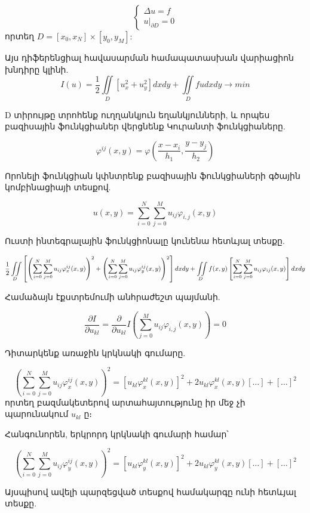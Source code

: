 \documentclass[fleqn, bachelor,subf,12pt,notitlepage]{article}
\newcommand\scalemath[2]{\scalebox{#1}{\mbox{\ensuremath{\displaystyle #2}}}}
\begin{document}
				$$
					\begin{cases}
								\Delta u =f \\
								u \Big |_{\partial D} = 0
					\end{cases}
				$$
որտեղ $D = \left[x_{0}, x_{N}\right] \times \left[y_{0}, y_{M}\right]$:

Այս դիֆերենցիալ հավասարման  համապատասխան վարիացիոն խնդիրը կլինի.
			$$I(u) = \frac{1}{2}\iint \limits_{D} \left[u_x^2 + u_y^2 \right]dxdy + \iint \limits_{D} fudxdy \longrightarrow min$$

D տիրույթը տրոհենք ուղղանկյուն եղանկյունների, և որպես բազիսային ֆունկցիաներ վերցնենք Կուրանտի ֆունկցիաները.

					$$\varphi^{ij}(x,y)=\varphi \left(\dfrac{x-x_{i}}{h_{1}}, \dfrac{y-y_{j}}{h_{2}}\right)$$

\noindent Որոնելի ֆունկցիան կփնտրենք բազիսային ֆունկցիաների գծային կոմբինացիայի տեսքով.

					$$u(x,y) = \sum_{i=0}^{N} \sum_{j=0}^{M} u_{ij}\varphi_{i, j}(x,y)$$

\noindent  Ուստի ինտեգրալային ֆունկցիոնալը կունենա հետևյալ տեսքը.

$$\scalemath{0.9}{\frac{1}{2} \iint \limits_{D}\left[\left(\sum_{i=0}^{N} \sum_{j=0}^{M}u_{ij}\varphi_{x}^{ij}(x,y)\right)^2 + \left(\sum_{i=0}^{N} \sum_{j=0}^{M}u_{ij}\varphi_{y}^{ij}(x,y)\right)^2 \right]dxdy + \iint \limits_{D}f(x,y)\left[ \sum_{i=0}^{N} \sum_{j=0}^{M}u_{ij}\varphi_{ij}(x,y)\right]dxdy}$$

\noindent  Համաձայն էքստրեմումի անհրաժեշտ պայմանի.

$$\dfrac{\partial I}{ \partial u_{kl}} = \dfrac{\partial}{\partial u_{kl}} I \left(\sum_{j=0}^{M} u_{ij}\varphi_{i, j}(x,y)\right) = 0 $$

\noindent Դիտարկենք առաջին կրկնակի գումարը.

				$$\left(\sum_{i=0}^{N} \sum_{j=0}^{M}u_{ij}\varphi_{x}^{ij}(x,y)\right)^2 = \left[u_{kl}\varphi_{x}^{kl}(x,y)\right]^{2} + 2u_{kl}\varphi_{x}^{kl}(x,y)[\dots] + [\dots]^2$$
\noindent որտեղ բազմակետերով արտահայտությունը իր մեջ չի պարունակում $u_{kl}$ ը։

\noindent Հանգունորեն, երկրորդ կրկնակի գումարի համար՝

				$$\left(\sum_{i=0}^{N} \sum_{j=0}^{M}u_{ij}\varphi_{y}^{ij}(x,y)\right)^2 = \left[u_{kl}\varphi_{y}^{kl}(x,y)\right]^{2} + 2u_{kl}\varphi_{y}^{kl}(x,y)[\dots] + [\dots]^2$$

\noindent Այսպիսով ավելի պարզեցված տեսքով համակարգը ունի հետևյալ տեսքը.
\end{document}
